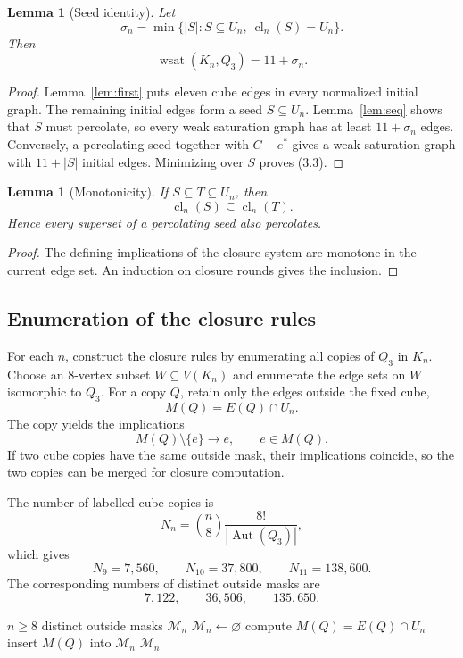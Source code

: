 \documentclass[11pt]{article}
\numberwithin{equation}{section}
\newtheorem{lemma}[theorem]{Lemma}
\newcommand{\wsat}{\operatorname{wsat}}
\newcommand{\cl}{\operatorname{cl}}
\newcommand{\Aut}{\operatorname{Aut}}
\begin{document}
\begin{lemma}[Seed identity]\label{lem:seed}
Let
\[
\sigma_n=\min\{|S|:S\subseteq U_n,\ \cl_n(S)=U_n\}.
\]
Then
\[
\boxed{\wsat(K_n,Q_3)=11+\sigma_n.}
\tag{3.3}
\]
\end{lemma}

\begin{proof}
Lemma~\ref{lem:first} puts eleven cube edges in every normalized initial graph. The remaining initial edges form a seed $S\subseteq U_n$. Lemma~\ref{lem:seq} shows that $S$ must percolate, so every weak saturation graph has at least $11+\sigma_n$ edges. Conversely, a percolating seed together with $C-e^*$ gives a weak saturation graph with $11+|S|$ initial edges. Minimizing over $S$ proves (3.3).
\end{proof}

\begin{lemma}[Monotonicity]\label{lem:mono}
If $S\subseteq T\subseteq U_n$, then
\[
\cl_n(S)\subseteq\cl_n(T).
\]
Hence every superset of a percolating seed also percolates.
\end{lemma}

\begin{proof}
The defining implications of the closure system are monotone in the current edge set. An induction on closure rounds gives the inclusion.
\end{proof}

\subsection{Enumeration of the closure rules}\label{sec:maskenumeration}
For each $n$, construct the closure rules by enumerating all copies of $Q_3$
in $K_n$. Choose an $8$-vertex subset $W\subseteq V(K_n)$ and enumerate the
edge sets on $W$ isomorphic to $Q_3$. For a copy $Q$, retain only the edges
outside the fixed cube,
\[
M(Q)=E(Q)\cap U_n.
\]
The copy yields the implications
\[
M(Q)\setminus\{e\}\longrightarrow e,
\qquad e\in M(Q).
\tag{3.4}
\]
If two cube copies have the same outside mask, their implications coincide,
so the two copies can be merged for closure computation.

The number of labelled cube copies is
\[
N_n=\binom{n}{8}\frac{8!}{|\Aut(Q_3)|},
\tag{3.5}
\]
which gives
\[
N_9=7,560,\qquad N_{10}=37,800,\qquad N_{11}=138,600.
\tag{3.6}
\]
The corresponding numbers of distinct outside masks are
\[
7,122,\qquad36,506,\qquad135,650.
\tag{3.7}
\]

\begin{algorithm}[t]
\caption{Construction of the complete outside-rule system}
\label{alg:masks}
\begin{algorithmic}[1]
\Require $n\ge8$
\Ensure distinct outside masks $\mathcal M_n$
\State $\mathcal M_n\gets\varnothing$
        \State compute $M(Q)=E(Q)\cap U_n$
        \State insert $M(Q)$ into $\mathcal M_n$
    \EndFor
\EndFor
\State \Return $\mathcal M_n$
\end{algorithmic}
\end{algorithm}
\end{document}
